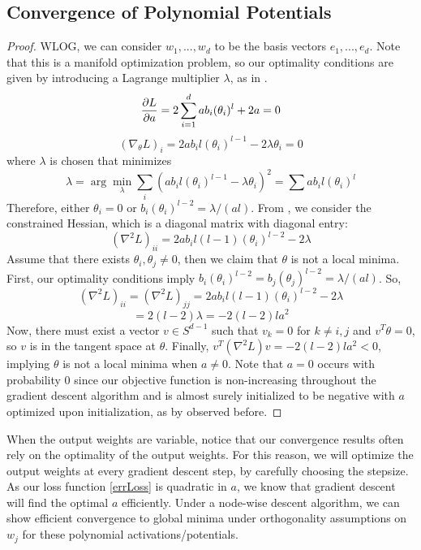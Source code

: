 
\subsection{Convergence of Polynomial Potentials}

\polystrict*

\begin{proof}
WLOG, we can consider $w_1,...,w_d$ to be the basis vectors $e_1,...,e_d$. Note that this is a manifold optimization problem, so our optimality conditions are given by introducing a Lagrange multiplier $\lambda$, as in \cite{GeHJY15}.
\[\frac{\partial L}{\partial a} = 2\sum_{i=1}^d ab_i (\theta_i)^l + 2a = 0\]
\[ (\nabla_\theta L)_i = 2ab_il(\theta_i)^{l-1}  -2\lambda \theta_i = 0 \]
where $\lambda$ is chosen that minimizes 
\[\lambda = \arg \min_\lambda \sum_i (ab_i l (\theta_i)^{l-1} - \lambda\theta_i)^2 = \sum ab_i l (\theta_i)^l \]
Therefore, either $\theta_i = 0$ or $b_i (\theta_i)^{l-2} = \lambda/(al)$. From \cite{GeHJY15}, we consider the constrained Hessian, which is a diagonal matrix with diagonal entry: 
\[(\nabla^2 L)_{ii} = 2a b_i l(l-1)(\theta_i)^{l-2} - 2 \lambda\]
Assume that there exists $\theta_i, \theta_j \neq 0$, then we claim that $\theta$ is not a local minima. First, our optimality conditions imply $b_i(\theta_i)^{l-2} = b_j (\theta_j)^{l-2} = \lambda/(al)$. So,
\[(\nabla^2 L)_{ii} = (\nabla^2L)_{jj} = 2a b_i l(l-1)(\theta_i)^{l-2} - 2 \lambda\]
\[ = 2(l-2)\lambda = -2(l-2)la^2\]
Now, there must exist a vector $v \in S^{d-1}$ such that $v_k = 0$ for $k \neq i,j$ and $v^T\theta = 0$, so $v$ is in the tangent space at $\theta$. Finally, $v^T(\nabla^2 L) v  = -2(l-2)l a^2 < 0$, implying $\theta$ is not a local minima when $a \neq 0$. Note that $a = 0$ occurs with probability 0 since our objective function is non-increasing throughout the gradient descent algorithm and is almost surely initialized to be negative with $a$ optimized upon initialization, as by observed before.
\end{proof}

When the output weights are variable, notice that our convergence results often rely on the optimality of the output weights. For this reason, we will optimize the output weights at every gradient descent step, by carefully choosing the stepsize. As our loss function \eqref{errLoss} is quadratic in $a$, we know that gradient descent will find the optimal $a$ efficiently. Under a node-wise descent algorithm, we can show efficient convergence to global minima under orthogonality assumptions on $w_j$ for these polynomial activations/potentials.

